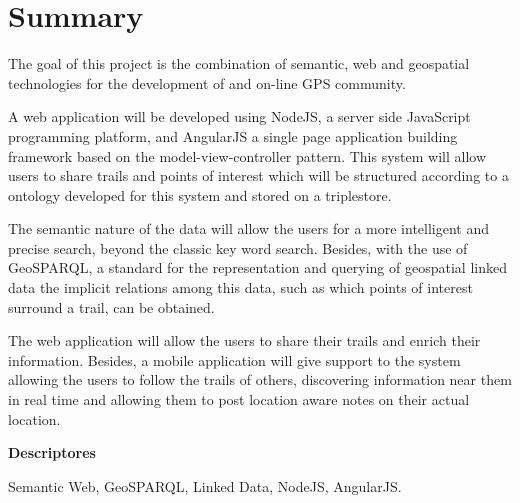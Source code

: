 \chapter*{Summary}

The goal of this project is the combination of semantic, web and geospatial technologies for the development of and on-line GPS community.
 
A web application will be developed using NodeJS, a server side JavaScript programming platform, and AngularJS a single page application building framework based on the model-view-controller pattern. This system will allow users to share trails and points of interest which will be structured according to a ontology developed for this system and stored on a triplestore.

The semantic nature of the data will allow the users for a more intelligent and precise search, beyond the classic key word search. Besides, with the use of GeoSPARQL, a standard for the representation and querying of geospatial linked data the implicit relations among this data, such as which points of interest surround a trail, can be obtained.

The web application will allow the users to share their trails and enrich their information. Besides, a mobile application will give support to the system allowing the users to follow the trails of others, discovering information near them in real time and allowing them to post location aware notes on their actual location.


\vspace{2em}

{\Large\bfseries\sectionfont Descriptores}
\vspace{3\medskipamount}

Semantic Web, GeoSPARQL, Linked Data, NodeJS, AngularJS.